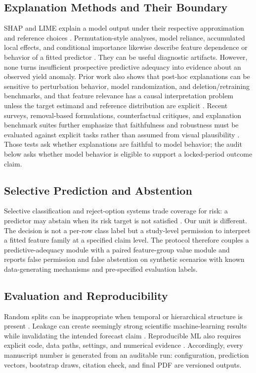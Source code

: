 \documentclass[conference]{IEEEtran}
\begin{document}
\subsection{Explanation Methods and Their Boundary}
SHAP and LIME explain a model output under their respective approximation and
reference choices \cite{LundbergLee2017,Ribeiro2016}. Permutation-style analyses,
model reliance, accumulated local effects, and conditional importance likewise
describe feature dependence or behavior of a fitted predictor
\cite{Fisher2019,ApleyZhu2020,Strobl2008}. They can be useful diagnostic artifacts.
However, none turns insufficient prospective predictive adequacy into evidence about an
observed yield anomaly. Prior work also shows that post-hoc explanations can be
sensitive to perturbation behavior, model randomization, and deletion/retraining
benchmarks, and that feature relevance has a causal interpretation problem unless
the target estimand and reference distribution are explicit
\cite{Adebayo2018,Hooker2019,Yeh2019,Slack2020,Janzing2020}. Recent surveys,
removal-based formulations, counterfactual critiques, and explanation benchmark
suites further emphasize that faithfulness and robustness must be evaluated
against explicit tasks rather than assumed from visual plausibility
\cite{Covert2021,Keane2021,Agarwal2022,Nauta2023,Hedstrom2023}. Those tests ask
whether explanations are faithful to model behavior; the audit below asks
whether model behavior is eligible to support a locked-period outcome claim.

\subsection{Selective Prediction and Abstention}
Selective classification and reject-option systems trade coverage for risk:
a predictor may abstain when its risk target is not satisfied
\cite{ElYanivWiener2010,GeifmanElYaniv2017}. Our unit is different. The decision
is not a per-row class label but a study-level permission to interpret a fitted
feature family at a specified claim level. The protocol therefore couples a
predictive-adequacy module with a paired feature-group value module and reports
false permission and false abstention on synthetic scenarios with known
data-generating mechanisms and pre-specified evaluation labels.

\subsection{Evaluation and Reproducibility}
Random splits can be inappropriate when temporal or hierarchical structure is
present \cite{Roberts2017}. Leakage can create seemingly strong scientific
machine-learning results while invalidating the intended forecast claim
\cite{KapoorNarayanan2023}. Reproducible ML also requires explicit code, data
paths, settings, and numerical evidence \cite{Pineau2021}. Accordingly, every
manuscript number is generated from an auditable run: configuration, prediction
vectors, bootstrap draws, citation check, and final PDF are versioned outputs.
\end{document}
